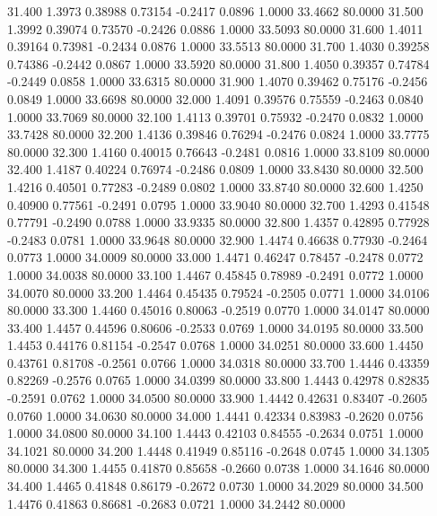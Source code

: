   31.400   1.3973   0.38988   0.73154  -0.2417   0.0896   1.0000  33.4662  80.0000
  31.500   1.3992   0.39074   0.73570  -0.2426   0.0886   1.0000  33.5093  80.0000
  31.600   1.4011   0.39164   0.73981  -0.2434   0.0876   1.0000  33.5513  80.0000
  31.700   1.4030   0.39258   0.74386  -0.2442   0.0867   1.0000  33.5920  80.0000
  31.800   1.4050   0.39357   0.74784  -0.2449   0.0858   1.0000  33.6315  80.0000
  31.900   1.4070   0.39462   0.75176  -0.2456   0.0849   1.0000  33.6698  80.0000
  32.000   1.4091   0.39576   0.75559  -0.2463   0.0840   1.0000  33.7069  80.0000
  32.100   1.4113   0.39701   0.75932  -0.2470   0.0832   1.0000  33.7428  80.0000
  32.200   1.4136   0.39846   0.76294  -0.2476   0.0824   1.0000  33.7775  80.0000
  32.300   1.4160   0.40015   0.76643  -0.2481   0.0816   1.0000  33.8109  80.0000
  32.400   1.4187   0.40224   0.76974  -0.2486   0.0809   1.0000  33.8430  80.0000
  32.500   1.4216   0.40501   0.77283  -0.2489   0.0802   1.0000  33.8740  80.0000
  32.600   1.4250   0.40900   0.77561  -0.2491   0.0795   1.0000  33.9040  80.0000
  32.700   1.4293   0.41548   0.77791  -0.2490   0.0788   1.0000  33.9335  80.0000
  32.800   1.4357   0.42895   0.77928  -0.2483   0.0781   1.0000  33.9648  80.0000
  32.900   1.4474   0.46638   0.77930  -0.2464   0.0773   1.0000  34.0009  80.0000
  33.000   1.4471   0.46247   0.78457  -0.2478   0.0772   1.0000  34.0038  80.0000
  33.100   1.4467   0.45845   0.78989  -0.2491   0.0772   1.0000  34.0070  80.0000
  33.200   1.4464   0.45435   0.79524  -0.2505   0.0771   1.0000  34.0106  80.0000
  33.300   1.4460   0.45016   0.80063  -0.2519   0.0770   1.0000  34.0147  80.0000
  33.400   1.4457   0.44596   0.80606  -0.2533   0.0769   1.0000  34.0195  80.0000
  33.500   1.4453   0.44176   0.81154  -0.2547   0.0768   1.0000  34.0251  80.0000
  33.600   1.4450   0.43761   0.81708  -0.2561   0.0766   1.0000  34.0318  80.0000
  33.700   1.4446   0.43359   0.82269  -0.2576   0.0765   1.0000  34.0399  80.0000
  33.800   1.4443   0.42978   0.82835  -0.2591   0.0762   1.0000  34.0500  80.0000
  33.900   1.4442   0.42631   0.83407  -0.2605   0.0760   1.0000  34.0630  80.0000
  34.000   1.4441   0.42334   0.83983  -0.2620   0.0756   1.0000  34.0800  80.0000
  34.100   1.4443   0.42103   0.84555  -0.2634   0.0751   1.0000  34.1021  80.0000
  34.200   1.4448   0.41949   0.85116  -0.2648   0.0745   1.0000  34.1305  80.0000
  34.300   1.4455   0.41870   0.85658  -0.2660   0.0738   1.0000  34.1646  80.0000
  34.400   1.4465   0.41848   0.86179  -0.2672   0.0730   1.0000  34.2029  80.0000
  34.500   1.4476   0.41863   0.86681  -0.2683   0.0721   1.0000  34.2442  80.0000
